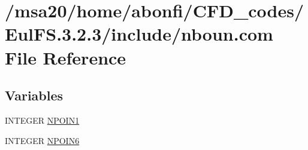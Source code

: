 \hypertarget{msa20_2home_2abonfi_2_c_f_d__codes_2_eul_f_s_83_82_83_2include_2nboun_8com}{\section{/msa20/home/abonfi/\-C\-F\-D\-\_\-codes/\-Eul\-F\-S.3.2.3/include/nboun.com File Reference}
\label{msa20_2home_2abonfi_2_c_f_d__codes_2_eul_f_s_83_82_83_2include_2nboun_8com}
}
\subsection*{Variables}
\begin{DoxyCompactItemize}
\item 
I\-N\-T\-E\-G\-E\-R \hyperlink{msa20_2home_2abonfi_2_c_f_d__codes_2_eul_f_s_83_82_83_2include_2nboun_8com_a16b7b164151edb849dfc519b81b22952}{N\-P\-O\-I\-N1}
\item 
I\-N\-T\-E\-G\-E\-R \hyperlink{msa20_2home_2abonfi_2_c_f_d__codes_2_eul_f_s_83_82_83_2include_2nboun_8com_ad5396b70ef7b4f2b539b154ba13a65bf}{N\-P\-O\-I\-N6}
\end{DoxyCompactItemize}


